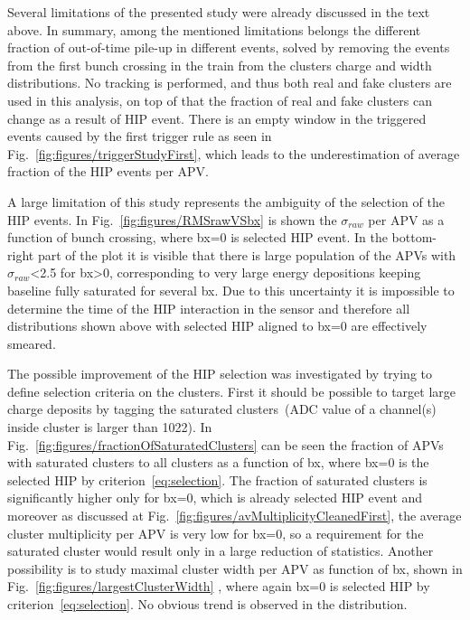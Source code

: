 Several limitations of the presented study were already discussed in the text above. In summary, among the mentioned limitations belongs the different fraction of out-of-time pile-up in different events, solved by removing the events from the first bunch crossing in the train from the clusters charge and width distributions. No tracking is performed, and thus both real and fake clusters are used in this analysis, on top of that the fraction of real and fake clusters can change as a result of HIP event. There is an empty window in the triggered events caused by the first trigger rule as seen in Fig.~\ref{fig:figures/triggerStudyFirst}, which leads to the underestimation of average fraction of the HIP events per APV.


A large limitation of this study represents the ambiguity of the selection of the HIP events. In Fig.~\ref{fig:figures/RMSrawVSbx} is shown the $\sigma_{raw}$ per APV as a function of bunch crossing, where bx=0 is selected HIP event. In the bottom-right part of the plot it is visible that there is large population of the APVs with $\sigma_{raw}$<2.5 for bx>0, corresponding to very large energy depositions keeping baseline fully saturated for several bx. Due to this uncertainty it is impossible to determine the time of the HIP interaction in the sensor and therefore all distributions shown above with selected HIP aligned to bx=0 are effectively smeared. 


The possible improvement of the HIP selection was investigated by trying to define selection criteria on the clusters. First it should be possible to target large charge deposits by tagging the saturated clusters~(ADC value of a channel(s) inside cluster is larger than 1022). In Fig.~\ref{fig:figures/fractionOfSaturatedClusters} can be seen the fraction of APVs with saturated clusters to all clusters as a function of bx, where bx=0 is the selected HIP by criterion~\ref{eq:selection}. The fraction of saturated clusters is significantly higher only for bx=0, which is already selected HIP event and moreover as discussed at Fig.~\ref{fig:figures/avMultiplicityCleanedFirst}, the average cluster multiplicity per APV is very low for bx=0, so a requirement for the saturated cluster would result only in a large reduction of statistics. Another possibility is to study maximal cluster width per APV as function of bx, shown in Fig.~\ref{fig:figures/largestClusterWidth} , where again bx=0 is selected HIP by criterion~\ref{eq:selection}. No obvious trend is observed in the distribution. 

